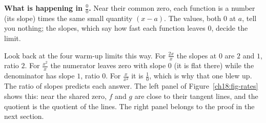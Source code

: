 \begin{happeningbox}
\textbf{What is happening in $\tfrac{0}{0}$.} Near their common zero, each function is
a number (its slope) times the same small quantity $(x-a)$. The values, both $0$ at
$a$, tell you nothing; the slopes, which say how fast each function leaves $0$, decide
the limit.
\end{happeningbox}

Look back at the four warm-up limits this way. For $\tfrac{2x}{x}$ the slopes at
$0$ are $2$ and $1$, ratio $2$. For $\tfrac{x^2}{x}$ the numerator leaves zero with
slope $0$ (it is flat there) while the denominator has slope $1$, ratio $0$. For
$\tfrac{x}{x^2}$ it is $\tfrac10$, which is why that one blew up. The ratio of slopes
predicts each answer. The left panel of Figure~\ref{ch18:fig-rates} shows this: near
the shared zero, $f$ and $g$ are close to their tangent lines, and the quotient is the
quotient of the lines. The right panel belongs to the proof in the next section.

